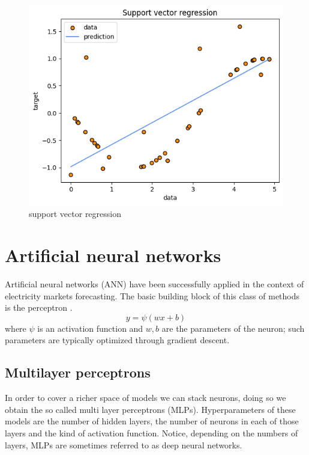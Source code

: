 \begin{figure}
    \includegraphics[width=\textwidth]{images/svr1.png}
    \caption{support vector regression}
    \label{fig:svr1}
\end{figure}

\section{Artificial neural networks}
Artificial neural networks (ANN) have been successfully applied in the context of electricity markets forecasting. The basic building block of this class of methods is the perceptron \cite{rosenblatt1958perceptron}.
\begin{equation}
    y=\psi(wx+b)
\end{equation}
where $\psi$ is an activation function and $w,b$ are the parameters of the neuron; such parameters are typically optimized through gradient descent.

\subsection{Multilayer perceptrons}
In order to cover a richer space of models we can stack neurons, doing so we obtain the so called multi layer perceptrons (MLPs). Hyperparameters of these models are the number of hidden layers, the number of neurons in each of those layers and the kind of activation function.
Notice, depending on the numbers of layers, MLPs are sometimes referred to as deep neural networks.


